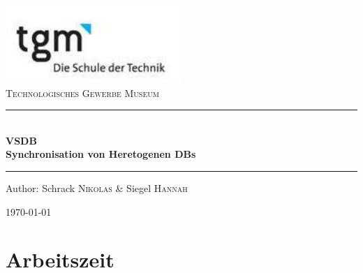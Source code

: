\documentclass[12pt]{article}
\begin{document}
\begin{titlepage}
\begin{center}
\includegraphics[width=0.5\textwidth]{images/logo}\\[1cm]    

\textsc{\LARGE Technologisches Gewerbe Museum}\\[1.5cm]

\rule{12cm}{1mm}
{ \huge \bfseries  \\\large VSDB\\ \huge Synchronisation von Heretogenen DBs \\[0.4cm] }

\rule{12cm}{1mm}

\noindent 
\vspace{5cm}

\begin{center}
\large
Author: 
Schrack \textsc{Nikolas} \&
Siegel \textsc{Hannah}
\end{center}

\vfill

{\large \today}

\end{center}
\end{titlepage}

\tableofcontents


\ohead{\headmark}

\newpage
\section{Arbeitszeit}
\end{document}
